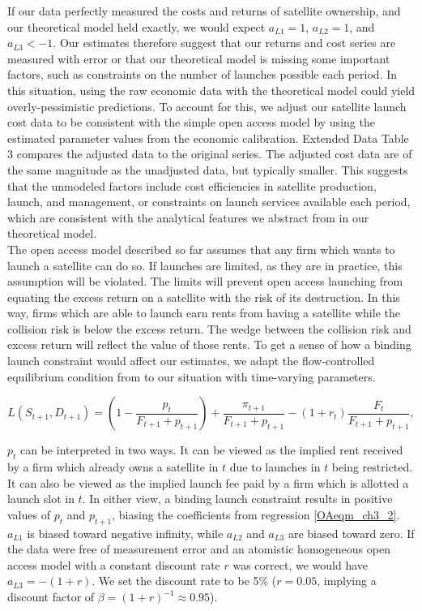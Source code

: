 \documentclass[9pt,twoside,lineno]{pnas-new}
\begin{document}
If our data perfectly measured the costs and returns of satellite ownership, and our theoretical model held exactly, we would expect $a_{L 1}=1$, $a_{L 2} = 1$, and $a_{L 3} < -1$. Our estimates therefore suggest that our returns and cost series are measured with error or that our theoretical model is missing some important factors, such as constraints on the number of launches possible each period. In this situation, using the raw economic data with the theoretical model could yield overly-pessimistic predictions. To account for this, we adjust our satellite launch cost data to be consistent with the simple open access model by using the estimated parameter values from the economic calibration. Extended Data Table 3 compares the adjusted data to the original series. The adjusted cost data are of the same magnitude as the unadjusted data, but typically smaller. This suggests that the unmodeled factors include cost efficiencies in satellite production, launch, and management, or constraints on launch services available each period, which are consistent with the analytical features we abstract from in our theoretical model. \\

The open access model described so far assumes that any firm which wants to launch a satellite can do so. If launches are limited, as they are in practice, this assumption will be violated. The limits will prevent open access launching from equating the excess return on a satellite with the risk of its destruction. In this way, firms which are able to launch earn rents from having a satellite while the collision risk is below the excess return. The wedge between the collision risk and excess return will reflect the value of those rents. To get a sense of how a binding launch constraint would affect our estimates, we adapt the flow-controlled equilibrium condition from \cite{rao2019diss} to our situation with time-varying parameters.

\begin{equation}
\label{OAfloweqmcond}
L(S_{t+1},D_{t+1}) = \left(1 - \frac{p_t}{F_{t+1} + p_{t+1}} \right) + \frac{\pi_{t+1}}{F_{t+1} + p_{t+1}} - (1+r_t)\frac{F_t}{F_{t+1} + p_{t+1}},
\end{equation}

$p_t$ can be interpreted in two ways. It can be viewed as the implied rent received by a firm which already owns a satellite in $t$ due to launches in $t$ being restricted. It can also be viewed as the implied launch fee paid by a firm which is allotted a launch slot in $t$. In either view, a binding launch constraint results in positive values of $p_t$ and $p_{t+1}$, biasing the coefficients from regression \ref{OAeqm_ch3_2}. $a_{L1}$ is biased toward negative infinity, while $a_{L 2}$ and $a_{L 3}$ are biased toward zero. If the data were free of measurement error and an atomistic homogeneous open access model with a constant discount rate $r$ was correct, we would have $a_{L3} = - (1+r)$. We set the discount rate to be 5\% ($r=0.05$, implying a discount factor of $\beta = (1+r)^{-1} \approx 0.95$). \\
\end{document}

